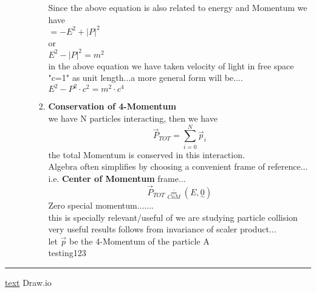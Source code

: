 \documentclass[11pt,a4paper]{article}
\begin{document}
\begin{enumerate}
\begin{enumerate}
\begin{enumerate}
                                    Since the above equation is also related to energy and Momentum we have\\
                                    $=-E^2 + \lvert P \rvert^2$\\
                                    or \\
                                    $E^2 - \lvert P \rvert^2 = m^2$\\
                                    in the above equation we have taken velocity of light in free space "c=1" as unit length...a more general form will be....\\
                                    $E^2 -  P^2 \cdot c^2= m^2\cdot c^4$\\
                              \item \textbf{Conservation of 4-Momentum}\\
                                    we have N particles interacting, then we have\\
                                    \[\vec{P}_{TOT}= \sum_{i=0}^{N}\vec{p}_{i}\]
                                    the total Momentum is conserved in this interaction.\\
                                    Algebra often simplifies by choosing a convenient frame of reference...\\
                                    i.e. \textbf{Center of Momentum} frame...\\
                                    \[\vec{P}_{TOT} \mathop = \limits^{\cdot}_{CoM} (E,\underset{\sim}{0})\]
                                    Zero special momentum.......\\
                                    this is specially relevant/useful of we are studying particle collision\\
                                    very useful results follows from invariance of scaler product...\\
                                    let $\vec{p}$ be the 4-Momentum of the particle A\\
                                    testing123


                        \end{enumerate}
            \end{enumerate}
\end{enumerate}
\noindent\rule{\textwidth}{1pt}
\href{https://youtu.be/TiHHz3sKDbY?list=PL6Q1107aDr%SgQ1DBEugejXLfQX76hfSnX&t=1188}{text} Draw.io
\end{document}
